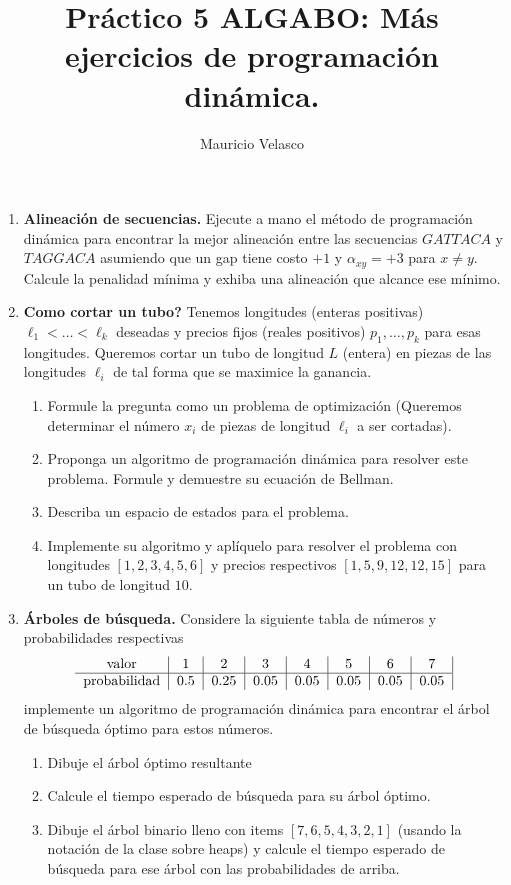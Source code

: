 \documentclass[12pt, a4paper]{article}
\date{}
\begin{document}
\title{Pr\'actico 5 ALGABO: Más ejercicios de programaci\'on dinámica.}
\author{Mauricio Velasco}
\maketitle{}
\begin{enumerate} 
\item {\bf Alineación de secuencias.} Ejecute a mano el método de programación dinámica para encontrar la mejor alineación entre las secuencias $GATTACA$ y $TAGGACA$ asumiendo que un gap tiene costo $+1$ y $\alpha_{xy}=+3$ para $x\neq y$. Calcule la penalidad mínima y exhiba una alineación que alcance ese mínimo.

\item {\bf Como cortar un tubo?} Tenemos longitudes (enteras positivas) $\ell_1<\dots< \ell_k$ deseadas y precios fijos (reales positivos) $p_1,\dots, p_k$ para esas longitudes. Queremos cortar un tubo de longitud $L$ (entera) en piezas de las longitudes $\ell_i$ de tal forma que se maximice la ganancia.  
\begin{enumerate}
\item Formule la pregunta como un problema de optimización (Queremos determinar el número $x_i$ de piezas de longitud $\ell_i$ a ser cortadas). 
\item Proponga un algoritmo de programación dinámica para resolver este problema. Formule y demuestre su ecuación de Bellman.
\item Describa un espacio de estados para el problema.
\item Implemente su algoritmo y aplíquelo para resolver el problema con longitudes $[1,2,3,4,5,6]$ y precios respectivos $[1, 5, 9, 12, 12, 15]$ para un tubo de longitud $10$.
\end{enumerate}



\item {\bf Árboles de búsqueda.} Considere la siguiente tabla de números y probabilidades respectivas
\[
\begin{tabular}{c|c|c|c|c|c|c|c|c}
\text{valor} & 1 & 2 & 3 & 4 & 5 & 6 & 7\\
\hline
\text{probabilidad} & 0.5 & 0.25 & 0.05 & 0.05 & 0.05 & 0.05 & 0.05 \\ 
\end{tabular}
\]
implemente un algoritmo de programación dinámica para encontrar el árbol de búsqueda óptimo para estos números.
\begin{enumerate}
\item Dibuje el árbol \'optimo resultante
\item Calcule el tiempo esperado de búsqueda para su árbol óptimo.
\item Dibuje el árbol binario lleno con items $[7,6,5,4,3,2,1]$ (usando la notación de la clase sobre heaps) y calcule el tiempo esperado de búsqueda para ese árbol con las probabilidades de arriba.
\end{enumerate}


\end{enumerate}
\end{document}
